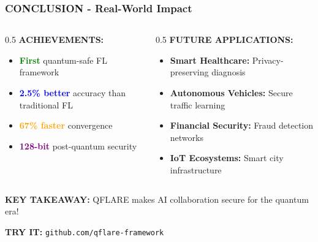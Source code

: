 \documentclass[aspectratio=169]{beamer}
\begin{document}
\begin{frame}
    \frametitle{CONCLUSION - Real-World Impact}
    \begin{columns}
        \begin{column}{0.5\textwidth}
            \textbf{ACHIEVEMENTS:}
            \begin{itemize}
                \item \textcolor{green}{\textbf{First}} quantum-safe FL framework
                \item \textcolor{blue}{\textbf{2.5\% better}} accuracy than traditional FL
                \item \textcolor{orange}{\textbf{67\% faster}} convergence
                \item \textcolor{purple}{\textbf{128-bit}} post-quantum security
            \end{itemize}
        \end{column}
        \begin{column}{0.5\textwidth}
            \textbf{FUTURE APPLICATIONS:}
            \begin{itemize}
                \item \textbf{Smart Healthcare:} Privacy-preserving diagnosis
                \item \textbf{Autonomous Vehicles:} Secure traffic learning
                \item \textbf{Financial Security:} Fraud detection networks
                \item \textbf{IoT Ecosystems:} Smart city infrastructure
            \end{itemize}
        \end{column}
    \end{columns}
    
    \vspace{0.5cm}
    
    \begin{center}
        \textbf{KEY TAKEAWAY:} QFLARE makes AI collaboration secure for the quantum era!
        
        \textbf{TRY IT:} \texttt{github.com/qflare-framework}
    \end{center}
\end{frame}
\end{document}
